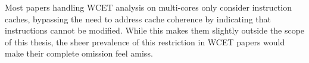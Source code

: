 Most papers handling WCET analysis on multi-cores only consider instruction
caches, bypassing the need to address cache coherence by indicating that
instructions cannot be modified. While this makes them slightly outside the
scope of this thesis, the sheer prevalence of this restriction in WCET papers
would make their complete omission feel amiss.
